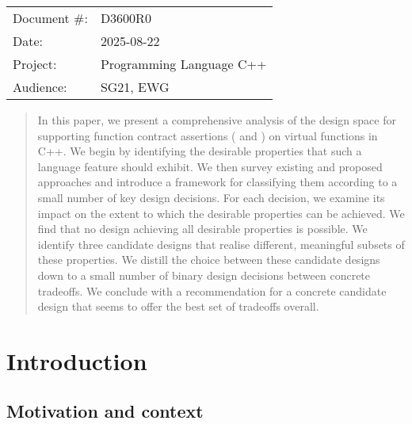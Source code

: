 \begin{tabular}{ll}
Document \#: & D3600R0 \\
Date: &2025-08-22 \\
Project: & Programming Language C++ \\
Audience: & SG21, EWG
\end{tabular}

\begin{abstract}
In this paper, we present a comprehensive analysis of the design space for supporting function contract assertions ( and ) on virtual functions in C++. We begin by identifying the desirable properties that such a language feature should exhibit. We then survey existing and proposed approaches and introduce a framework for classifying them according to a small number of key design decisions. For each decision, we examine its impact on the extent to which the desirable properties can be achieved. We find that no design achieving all desirable properties is possible. We identify three candidate designs that realise different, meaningful subsets of these properties. We distill the choice between these candidate designs down to a small number of binary design decisions between concrete tradeoffs. We conclude with a recommendation for a concrete candidate design that seems to offer the best set of tradeoffs overall.
\end{abstract}


\pagebreak
\tableofcontents*
\pagebreak






\section{Introduction}

\subsection{Motivation and context}

